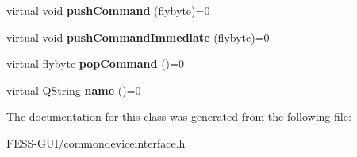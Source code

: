 \begin{DoxyCompactItemize}
virtual void {\bfseries push\+Command} (flybyte)=0
\item 
\hypertarget{class_common_device_interface_ae944b4f2b1794cf2da1b3c3af4bf0bb5}{}\label{class_common_device_interface_ae944b4f2b1794cf2da1b3c3af4bf0bb5} 
virtual void {\bfseries push\+Command\+Immediate} (flybyte)=0
\item 
\hypertarget{class_common_device_interface_ac930cbe65cec618ae2069b05e3c30a9a}{}\label{class_common_device_interface_ac930cbe65cec618ae2069b05e3c30a9a} 
virtual flybyte {\bfseries pop\+Command} ()=0
\item 
\hypertarget{class_common_device_interface_a3d80b22eafc88af3109b08491bef6e8a}{}\label{class_common_device_interface_a3d80b22eafc88af3109b08491bef6e8a} 
virtual Q\+String {\bfseries name} ()=0
\end{DoxyCompactItemize}


The documentation for this class was generated from the following file\+:\begin{DoxyCompactItemize}
\item 
F\+E\+S\+S-\/\+G\+U\+I/commondeviceinterface.\+h\end{DoxyCompactItemize}
